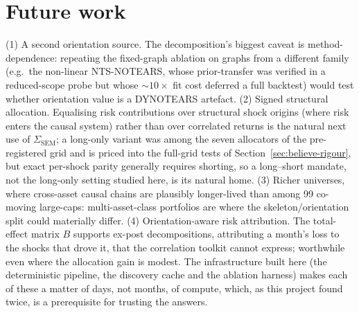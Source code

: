 \section{Future work}
\label{sec:future}

(1) A second orientation source. The decomposition's biggest caveat
is method-dependence: repeating the fixed-graph ablation on graphs from a
different family (e.g.\ the non-linear NTS-NOTEARS, whose prior-transfer was
verified in a reduced-scope probe but whose ${\sim}10\times$ fit cost
deferred a full backtest) would test whether orientation value is a
DYNOTEARS artefact. (2)
Signed structural allocation. Equalising risk contributions over
structural shock origins (where risk enters the causal system)
rather than over correlated returns is the natural next use of
$\Sigma_{\mathrm{SEM}}$; a long-only variant was among the seven
allocators of the pre-registered grid and is priced into the full-grid
tests of Section~\ref{sec:believe-rigour}, but exact per-shock parity
generally requires
shorting, so a long--short mandate, not the long-only setting studied here,
is its natural home. (3) Richer universes, where cross-asset
causal chains are plausibly longer-lived than among 99 co-moving
large-caps:
multi-asset-class portfolios are where the skeleton/orientation split
could materially differ. (4) Orientation-aware risk attribution.
The
total-effect matrix $B$ supports ex-post decompositions, attributing a
month's loss to the shocks that drove it, that the correlation toolkit
cannot express;
worthwhile even where the allocation gain is modest. The
infrastructure built here (the deterministic pipeline, the discovery cache
and the ablation harness) makes each of these a matter of days, not
months, of compute, which, as this project found twice, is a prerequisite
for trusting the answers.
